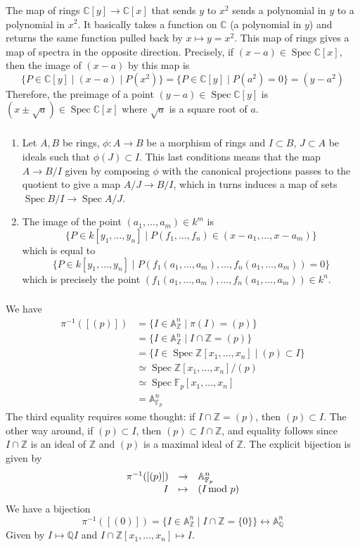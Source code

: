 \documentclass{article}
\newcommand{\A}{\mathbb{A}}
\newcommand{\Z}{\mathbb{Z}}
\newcommand{\Q}{\mathbb{Q}}
\newcommand{\C}{\mathbb{C}}
\newcommand{\F}{\mathbb{F}}
\DeclareMathOperator{\Spec}{Spec}
\newcommand{\applic}[4]{\begin{array}[t]{rcl}
#1 & \to & #2 \\
#3 & \mapsto & #4
\end{array}}
\newcommand{\exercise}{\subsubsection} %
\begin{document}
\exercise{} The map of rings $\C[y] \to \C[x]$ that sends $y$ to $x^2$ sends a polynomial in $y$ to a polynomial in $x^2$. It basically takes a function on $\C$ (a polynomial in $y$) and returns the same function pulled back by $x \mapsto y = x^2$. This map of rings gives a map of spectra in the opposite direction. Precisely, if $(x-a) \in \Spec \C[x]$, then the image of $(x-a)$ by this map is
\[\{P \in \C[y] \mid (x-a) \mid P(x^2)\} = \{P \in \C[y] \mid P(a^2) = 0\} = (y - a^2)\]
Therefore, the preimage of a point $(y-a) \in \Spec \C[y]$ is $(x \pm \sqrt{a}) \in \Spec \C[x]$ where $\sqrt{a}$ is a square root of $a$.

\exercise{} \begin{enumerate}
    \item Let $A,B$ be rings, $\phi : A \to B$ be a morphism of rings and $I \subset B$, $J \subset A$ be ideals such that $\phi(J) \subset I$. This last conditions means that the map $A \to B/I$ given by composing $\phi$ with the canonical projections passes to the quotient to give a map $A/J \to B/I$, which in turns induces a map of sets $\Spec B/I \to \Spec A/J$.
    \item The image of the point $(a_1,\dots,a_m) \in k^m$ is
    \[\{P \in k[y_1,\dots,y_n] \mid P(f_1,\dots,f_n) \in (x-a_1,\dots,x-a_m)\}\]
    which is equal to
    \[ \{P \in k[y_1,\dots,y_n] \mid P(f_1(a_1,\dots,a_m),\dots,f_n(a_1,\dots,a_m)) = 0\}\]
    which is precisely the point $(f_1(a_1,\dots,a_m),\dots,f_n(a_1,\dots,a_m)) \in k^n$.
\end{enumerate}

\exercise{} We have
\begin{align*}
    \pi^{-1}([(p)]) & = \{I \in \A^n_\Z \mid \pi(I) = (p)\} \\
    & = \{I \in \A^n_\Z \mid I \cap \Z = (p)\} \\
    & = \{I \in \Spec \Z[x_1,\dots,x_n] \mid (p) \subset I\} \\
    & \simeq \Spec \Z[x_1,\dots,x_n]/(p) \\
    & \simeq \Spec \F_p[x_1,\dots,x_n] \\
    & = \A^n_{\F_p}
\end{align*}
The third equality requires some thought: if $I \cap \Z = (p)$, then $(p) \subset I$. The other way around, if $(p) \subset I$, then $(p) \subset I \cap \Z$, and equality follows since $I\cap \Z$ is an ideal of $\Z$ and $(p)$ is a maximal ideal of $\Z$.
The explicit bijection is given by
\[\applic{\pi^{-1}([(p)])}{\A^n_{\F_p}}{I}{(I \!\!\! \mod p)}\]
We have a bijection
\[\pi^{-1}([(0)]) = \{I \in \A^n_\Z \mid I\cap \Z = \{0\}\} \leftrightarrow \A^n_\Q\]
Given by $I \mapsto \Q I$ and $I \cap \Z[x_1,\dots,x_n] \mapsto I$.
\end{document}
